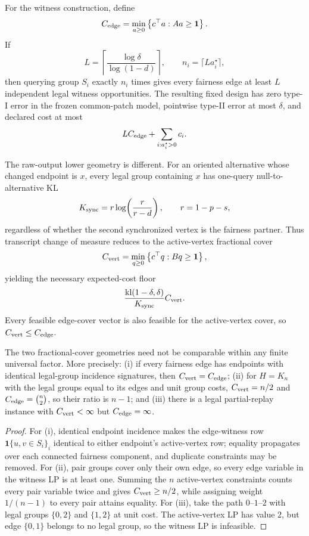 For the witness construction, define
\[
C_{\rm edge}
=
\min_{a\ge0}
\left\{
c^\top a: Aa\ge\mathbf{1}
\right\}.
\]
If
\[
L=
\left\lceil
\frac{\log\delta}{\log(1-d)}
\right\rceil,
\qquad
n_i=\lceil L a_i^\star\rceil,
\]
then querying group $S_i$ exactly $n_i$ times gives every fairness edge at least
$L$ independent legal witness opportunities.  The resulting fixed design has
zero type-I error in the frozen common-patch model, pointwise type-II error at
most $\delta$, and declared cost at most
\[
L C_{\rm edge}
+
\sum_{i:a_i^\star>0} c_i.
\]

The raw-output lower geometry is different.  For an oriented alternative whose
changed endpoint is $x$, every legal group containing $x$ has one-query
null-to-alternative KL
\[
K_{\rm sync}
=
r\log\!\left(\frac r{r-d}\right),
\qquad r=1-p-s,
\]
regardless of whether the second synchronized vertex is the fairness partner.
Thus transcript change of measure reduces to the active-vertex fractional cover
\[
C_{\rm vert}
=
\min_{q\ge0}
\left\{
c^\top q:Bq\ge\mathbf{1}
\right\},
\]
yielding the necessary expected-cost floor
\[
\frac{\mathrm{kl}(1-\delta,\delta)}{K_{\rm sync}}C_{\rm vert}.
\]
Every feasible edge-cover vector is also feasible for the active-vertex cover,
so $C_{\rm vert}\le C_{\rm edge}$.

\begin{proposition}
\label{prop:p17-geometry-separation}
The two fractional-cover geometries need not be comparable within any finite
universal factor.  More precisely: (i) if every fairness edge has endpoints
with identical legal-group incidence signatures, then
$C_{\rm vert}=C_{\rm edge}$; (ii) for $H=K_n$ with the legal groups equal to
its edges and unit group costs,
$C_{\rm vert}=n/2$ and $C_{\rm edge}=\binom n2$, so their ratio is $n-1$;
and (iii) there is a legal partial-replay instance with
$C_{\rm vert}<\infty$ but $C_{\rm edge}=\infty$.
\end{proposition}

\begin{proof}
For (i), identical endpoint incidence makes the edge-witness row
$\mathbf 1\{u,v\in S_i\}_i$ identical to either endpoint's active-vertex
row; equality propagates over each connected fairness component, and duplicate
constraints may be removed.  For (ii), pair groups cover only their own edge, so
every edge variable in the witness LP is at least one.  Summing the $n$
active-vertex constraints counts every pair variable twice and gives
$C_{\rm vert}\ge n/2$, while assigning weight $1/(n-1)$ to every pair
attains equality.  For (iii), take the path $0$--$1$--$2$ with legal groups
$\{0,2\}$ and $\{1,2\}$ at unit cost.  The active-vertex LP has value $2$,
but edge $\{0,1\}$ belongs to no legal group, so the witness LP is infeasible.
\end{proof}


